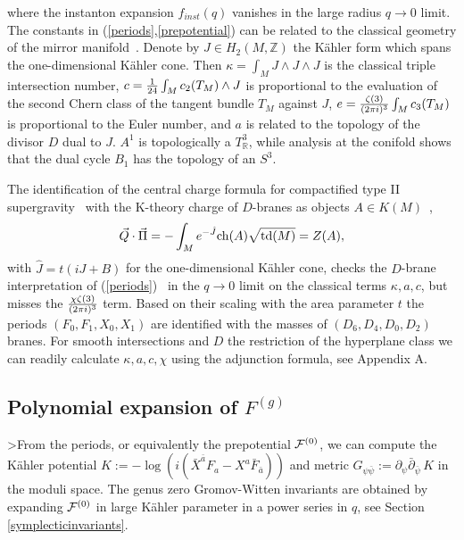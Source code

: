 \documentclass[12pt]{article}
\begin{document}
where the instanton expansion $f_{inst}(q)$  vanishes in the large
radius  $q\rightarrow 0$ limit. The constants in
(\ref{periods},\ref{prepotential}) can be related to the classical
geometry of the mirror
manifold~\cite{Hosono:1994ax,Candelas:1990rm}. Denote by  $J\in
H_2(M,\mathbb{Z})$ the K\"ahler form which spans the one-dimensional
K\"ahler cone. Then $\kappa=\int_M J\wedge J\wedge J
$ is the classical triple intersection number, $c={1\over 24}
\int_M c_2(T_M) \wedge J$ is proportional to the  evaluation of
the second Chern class of the tangent bundle $T_M$ against $J$,
$e={\zeta(3)\over (2 \pi i)^3}\int_M c_3(T_M)$ is proportional to
the Euler number, and  $a$ is related to the topology of the divisor
$D$ dual to $J$. $A^1$ is topologically a $T_{\mathbb{R}}^3$,
while analysis at the conifold shows that the dual cycle $B_1$ has
the topology of an $S^3$.

The identification of the central charge formula for compactified
type II supergravity~\cite{Ceresole:1995jg} with the K-theory
charge of $D$-branes as objects $A\in
K(M)$~\cite{Minasian:1997mm,Cheung:1997az},
\begin{equation}
\vec Q\cdot \vec \Pi=-\int_M e^{-\hat J} {\rm ch}(A)\sqrt{{\rm td}( M )}=Z(A),
\label{dbranecharge}
\end{equation}
with $\hat J =t (i J+B)$ for the one-dimensional K\"ahler cone,
checks the $D$-brane interpretation of (\ref{periods})~\cite{Brunner:1999jq,Diaconescu:1999vp,Mayr:2000as}
in the $q\rightarrow 0$ limit on the classical terms $\kappa, a, c$, but misses the  ${\chi \zeta(3)\over (2 \pi i)^3}$
term. Based on their scaling with the area parameter $t$ the periods $(F_0,F_1,X_0,X_1)$
are identified with the masses of $(D_6,D_4,D_0,D_2)$ branes. For smooth intersections and
$D$ the restriction of the hyperplane class we can readily calculate $\kappa,a,c,\chi$
using the adjunction formula, see Appendix A.

\subsection{Polynomial expansion of $F^{(g)}$}
\label{polynomialfg}

>From the periods,  or equivalently the prepotential ${\cal
F}^{(0)}$, we can compute the K\"ahler potential $K:=-\log
(i\left({\bar X}^{\bar a} F_a- X^{a} \bar F_{\bar a}\right))$ and
metric $G_{\psi\bar{\psi}}:=\partial_\psi {\bar\partial}_{\bar
\psi}\, K$ in the moduli space. The genus zero Gromov-Witten
invariants are obtained by expanding ${\cal F}^{(0)}$ in large
K\"ahler parameter in a power series in $q$, see Section
\ref{symplecticinvariants}.
\end{document}
